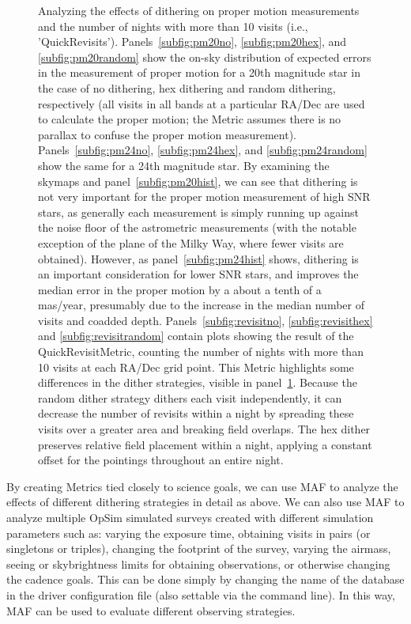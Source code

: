 \documentclass[]{spie}  %
\begin{document}
\begin{figure}
\begin{subfigure}[]{0.3\textwidth}
\caption[]{}
\label{subfig:revisithist}
\end{subfigure}
\caption[]
{\label{fig:dither_pm_revis}
Analyzing the effects of dithering on proper motion measurements and
the number of nights with more than 10 visits (i.e.,
'QuickRevisits'). Panels~\ref{subfig:pm20no}, \ref{subfig:pm20hex},
and \ref{subfig:pm20random} show the on-sky distribution of expected errors in the
measurement of proper motion for a 20th magnitude star in the case of
no dithering, hex dithering and random dithering, respectively (all visits in
all bands at a particular RA/Dec are used to calculate the proper
motion; the Metric assumes there is no parallax to confuse the proper
motion measurement). Panels~\ref{subfig:pm24no}, \ref{subfig:pm24hex},
and \ref{subfig:pm24random} show the same for a 24th magnitude
star. By examining the skymaps and panel~\ref{subfig:pm20hist}, we can
see that dithering is not very important for the proper motion
measurement of high SNR stars, as
generally each measurement is simply running up against the noise
floor of the astrometric measurements (with the notable exception of
the plane of the Milky Way, where fewer visits are obtained). However,
as panel~\ref{subfig:pm24hist} shows, dithering is an important
consideration for lower SNR stars, and improves the median error in
the proper motion by a
about a tenth of a mas/year, presumably due to the increase in the
median number of visits and coadded depth. 
Panels~\ref{subfig:revisitno}, \ref{subfig:revisithex} and
\ref{subfig:revisitrandom} contain plots showing the result of the
QuickRevisitMetric, counting the number of nights with more than 10
visits at each RA/Dec grid point. This Metric highlights some
differences in the dither strategies, visible in
panel~\ref{subfig:revisithist}. Because the random dither strategy
dithers each visit independently, it can decrease the number of
revisits within a night by spreading these visits over a greater area
and breaking field overlaps. The hex dither preserves relative field
placement within a night, applying a constant offset for the pointings
throughout an entire night. 
}
\end{figure}

By creating Metrics tied closely to science goals, we can use MAF to
analyze the effects of different dithering strategies in detail as above. We
can also use MAF to analyze multiple OpSim simulated surveys created
with different simulation parameters such as: varying the exposure time, obtaining visits in
pairs (or singletons or triples), changing the footprint of the
survey, varying the airmass, seeing or skybrightness limits for
obtaining observations, or otherwise changing the cadence goals. This
can be done simply by changing the name of the database in the driver
configuration file (also settable via the command line).  In
this way, MAF can be used to evaluate different observing strategies. 
\end{document}

